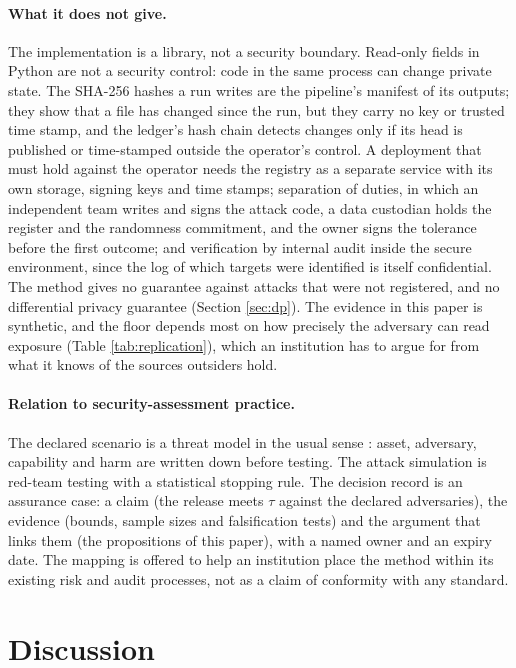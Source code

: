 \documentclass[11pt,a4paper]{article}
\theoremstyle{plain}
\theoremstyle{definition}
\theoremstyle{definition}
\theoremstyle{plain}
\begin{document}
\paragraph{What it does not give.} The implementation is a library, not a
security boundary. Read-only fields in Python are not a security control: code in
the same process can change private state. The SHA-256 hashes a run writes are
the pipeline's manifest of its outputs; they show that a file has changed since
the run, but they carry no key or trusted time stamp, and the ledger's hash chain
detects changes only if its head is published or time-stamped outside the
operator's control. A deployment that must hold against the operator needs the
registry as a separate service with its own storage, signing keys and time
stamps; separation of duties, in which an independent team writes and signs the
attack code, a data custodian holds the register and the randomness commitment,
and the owner signs the tolerance before the first outcome; and verification by
internal audit inside the secure environment, since the log of which targets
were identified is itself confidential. The method gives no guarantee against
attacks that were not registered, and no differential privacy guarantee (Section
\ref{sec:dp}). The evidence in this paper is synthetic, and the floor depends
most on how precisely the adversary can read exposure (Table
\ref{tab:replication}), which an institution has to argue for from what it knows
of the sources outsiders hold.

\paragraph{Relation to security-assessment practice.} The declared scenario is a
threat model in the usual sense \citep{shostack2014}: asset, adversary, capability
and harm are written down before testing. The attack simulation is red-team
testing with a statistical stopping rule. The decision record is an assurance
case: a claim (the release meets $\tau$ against the declared adversaries), the
evidence (bounds, sample sizes and falsification tests) and the argument that
links them (the propositions of this paper), with a named owner and an expiry
date. The mapping is offered to help an institution place the method within its
existing risk and audit processes, not as a claim of conformity with any
standard.

\section{Discussion}\label{sec:disc}
\end{document}
